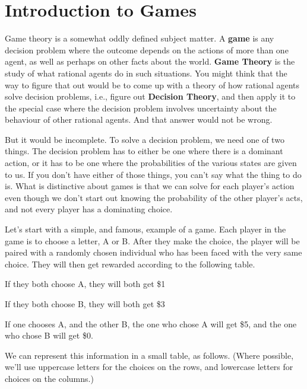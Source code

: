 \chapter[Introduction to Games]{Introduction to Games}


Game theory is a somewhat oddly defined subject matter. A \textbf{game} is any decision problem where the outcome depends on the actions of more than one agent, as well as perhaps on other facts about the world. \textbf{Game Theory} is the study of what rational agents do in such situations. You might think that the way to figure that out would be to come up with a theory of how rational agents solve decision problems, i.e., figure out \textbf{Decision Theory}, and then apply it to the special case where the decision problem involves uncertainty about the behaviour of other rational agents. And that answer would not be wrong.

But it would be incomplete. To solve a decision problem, we need one of two things. The decision problem has to either be one where there is a dominant action, or it has to be one where the probabilities of the various states are given to us. If you don't have either of those things, you can't say what the thing to do is. What is distinctive about games is that we can solve for each player's action even though we don't start out knowing the probability of the other player's acts, and not every player has a dominating choice. 

Let's start with a simple, and famous, example of a game. Each player in the game is to choose a letter, A or B. After they make the choice, the player will be paired with a randomly chosen individual who has been faced with the very same choice. They will then get rewarded according to the following table. 

\begin{itemize*}
\item If they both choose A, they will both get \$1
\item If they both choose B, they will both get \$3
\item If one chooses A, and the other B, the one who chose A will get \$5, and the one who chose B will get \$0.
\end{itemize*}

\noindent We can represent this information in a small table, as follows. (Where possible, we'll use uppercase letters for the choices on the rows, and lowercase letters for choices on the columns.)

